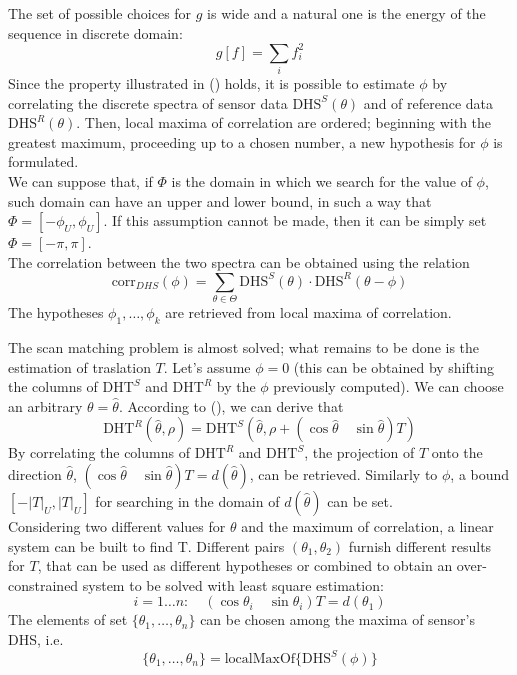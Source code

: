 \documentclass[a4paper, onecolumn]{report}
\begin{document}
The set of possible choices for $g$ is wide and a natural one is the energy of the sequence in discrete domain:
\begin{equation}
	g[f] = \sum_i f_i^2
\end{equation}
Since the property illustrated in () holds, it is possible to estimate $\phi$ by correlating the discrete spectra of sensor data $\mbox{DHS}^S(\theta)$ and of reference data $\mbox{DHS}^R(\theta)$. Then, local maxima of correlation are ordered; beginning with the greatest maximum, proceeding up to a chosen number, a new hypothesis for $\phi$ is formulated. \\
We can suppose that, if $\Phi$ is the domain in which we search for the value of $\phi$, such domain can have an upper and lower bound, in such a way that $\Phi = [-\phi_U, \phi_U]$. If this assumption cannot be made, then it can be simply set $\Phi = [-\pi, \pi]$. \\
The correlation between the two spectra can be obtained using the relation
\begin{equation}
	\mbox{corr}_{DHS}(\phi) = \sum_{\theta \in \Theta} \mbox{DHS}^S(\theta) \cdot \mbox{DHS}^R(\theta - \phi)
\end{equation}
The hypotheses ${\phi_1, \dots, \phi_k}$ are retrieved from local maxima of correlation.

The scan matching problem is almost solved; what remains to be done is the estimation of traslation $T$. Let's assume $\phi=0$ (this can be obtained by shifting the columns of $\mbox{DHT}^S$ and $\mbox{DHT}^R$ by the $\phi$ previously computed). We can choose an arbitrary $\theta = \hat{\theta}$. According to (), we can derive that
\begin{equation}
	\mbox{DHT}^R(\hat \theta, \rho) = \mbox{DHT}^S(\hat \theta, \rho + (\cos \hat \theta \quad \sin\hat\theta)T)
\end{equation}
By correlating the columns of $\mbox{DHT}^R$ and $\mbox{DHT}^S$, the projection of $T$ onto the direction $\hat\theta$, $(\cos\hat\theta \quad \sin\hat\theta)T = d(\hat\theta)$, can be retrieved. Similarly to $\phi$,  a bound $[-|T|_U, |T|_U]$ for searching in the domain of $d(\hat\theta)$ can be set.\\
Considering two different values for $\theta$ and the maximum of correlation, a linear system can be built to find T. Different pairs $(\theta_1, \theta_2)$ furnish different results for $T$, that can be used as different hypotheses or combined to obtain an over-constrained system to be solved with least square estimation:
\begin{equation}
	i = 1 \dots n: \quad (\cos\theta_i \quad \sin\theta_i)T = d(\theta_1)
\end{equation}
The elements of set $\{\theta_1,\dots,\theta_n\}$ can be chosen among the maxima of sensor's DHS, i.e. 
\begin{equation}
	\{\theta_1,\dots,\theta_n\} = \mbox{localMaxOf}\{\mbox{DHS}^S(\phi)\}
\end{equation}
\end{document}
